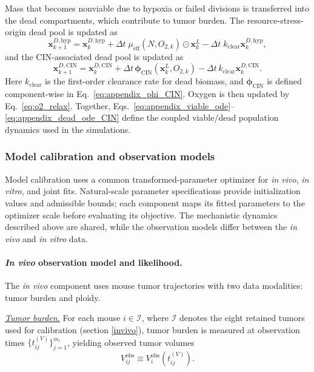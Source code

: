 \documentclass[11pt]{article}
\begin{document}
Mass that becomes nonviable due to hypoxia or failed divisions is transferred into the dead compartments, which contribute to tumor burden. The resource-stress-origin dead pool is updated as
\begin{equation}
\mathbf{x}^{D,\mathrm{hyp}}_{k+1}
=
\mathbf{x}^{D,\mathrm{hyp}}_{k}
+
\Delta t\;\mu_{\mathrm{eff}}(N,O_{2,k})\odot\mathbf{x}^{L}_{k}
-
\Delta t\;k_{\mathrm{clear}}\mathbf{x}^{D,\mathrm{hyp}}_{k},
\label{eq:appendix_dead_ode_hyp}
\end{equation}
and the CIN-associated dead pool is updated as
\begin{equation}
\mathbf{x}^{D,\mathrm{CIN}}_{k+1} = \mathbf{x}^{D,\mathrm{CIN}}_{k} + \Delta t \, \boldsymbol{\phi}_{\mathrm{CIN}}(\mathbf{x}^{L}_{k},O_{2,k}) - \Delta t \, k_{\mathrm{clear}}\mathbf{x}^{D,\mathrm{CIN}}_{k}.
\label{eq:appendix_dead_ode_CIN}
\end{equation}
Here $k_{\mathrm{clear}}$ is the first-order clearance rate for dead biomass, and $\boldsymbol{\phi}_{\mathrm{CIN}}$ is defined component-wise in Eq.~\eqref{eq:appendix_phi_CIN}. Oxygen is then updated by Eq.~\eqref{eq:o2_relax}. Together, Eqs.~\eqref{eq:appendix_viable_ode}--\eqref{eq:appendix_dead_ode_CIN} define the coupled viable/dead population dynamics used in the simulations.

\subsubsection{Model calibration and observation models}

Model calibration uses a common transformed-parameter optimizer for \textit{in vivo}, \textit{in vitro}, and joint fits. Natural-scale parameter specifications provide initialization values and admissible bounds; each component maps its fitted parameters to the optimizer scale before evaluating its objective. The mechanistic dynamics described above are shared, while the observation models differ between the \textit{in vivo} and \textit{in vitro} data.

\paragraph{\textit{In vivo} observation model and likelihood.}

The \textit{in vivo} component uses mouse tumor trajectories with two data modalities: tumor burden and ploidy.

\underline{\textit{Tumor burden.}} For each mouse $i\in\mathcal I$, where $\mathcal I$ denotes the eight retained tumors used for calibration (section \ref{invivo}), tumor burden is measured at observation times $\{t_{ij}^{(V)}\}_{j=1}^{m_i}$, yielding observed tumor volumes
\begin{equation}
V_{ij}^{\mathrm{obs}} \equiv V_i^{\mathrm{obs}}(t_{ij}^{(V)}).
\label{eq:appendix_observed_volume_definition}
\end{equation}
\end{document}

